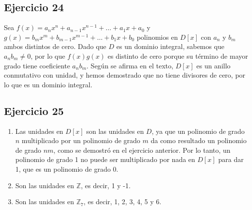 \begin{enumerate}
	
	\subsection*{Ejercicio 24}
	
	Sea \(f(x) = a_nx^n + a_{n-1}x^{n-1} + \ldots + a_1x + a_0\) y \(g(x) = b_mx^m + b_{m-1}x^{m-1} + \ldots + b_1x + b_0\) polinomios en \(D[x]\) con \(a_n\) y \(b_m\) ambos distintos de cero. Dado que \(D\) es un dominio integral, sabemos que \(a_n b_m \neq 0\), por lo que \(f(x)g(x)\) es distinto de cero porque su término de mayor grado tiene coeficiente \(a_n b_m\). Según se afirma en el texto, \(D[x]\) es un anillo conmutativo con unidad, y hemos demostrado que no tiene divisores de cero, por lo que es un dominio integral.
	
	\subsection*{Ejercicio 25}
	
	\begin{enumerate}
		\item Las unidades en \(D[x]\) son las unidades en \(D\), ya que un polinomio de grado \(n\) multiplicado por un polinomio de grado \(m\) da como resultado un polinomio de grado \(nm\), como se demostró en el ejercicio anterior. Por lo tanto, un polinomio de grado 1 no puede ser multiplicado por nada en \(D[x]\) para dar 1, que es un polinomio de grado 0.
		\item Son las unidades en \(\mathbb{Z}\), es decir, 1 y -1.
		\item Son las unidades en \(\mathbb{Z}_7\), es decir, 1, 2, 3, 4, 5 y 6.
	\end{enumerate}
	

\end{enumerate}

